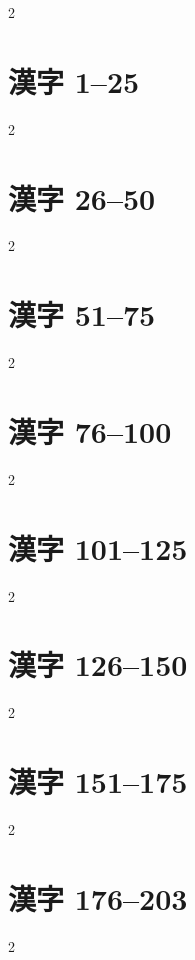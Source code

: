 \documentclass[10pt, a4paper]{ltjbook}
\begin{document}
\setlength{\columnseprule}{0.4pt}
\begin{multicols}{2}
    \vspace*{-4pt plus 10pt minus 10pt} %
	\listofglyph
\end{multicols}

\clearpage
{}

\setlength{\columnseprule}{0pt}


\chapter{漢字 1--25}
\begin{multicols}{2}


\chapter{漢字 26--50}
\begin{multicols}{2}


\chapter{漢字 51--75}
\begin{multicols}{2}


\chapter{漢字 76--100}
\begin{multicols}{2}


\chapter{漢字 101--125}
\begin{multicols}{2}


\chapter{漢字 126--150}
\begin{multicols}{2}


\chapter{漢字 151--175}
\begin{multicols}{2}


\chapter{漢字 176--203}
\begin{multicols}{2}



\end{multicols}
\end{multicols}
\end{multicols}
\end{multicols}
\end{multicols}
\end{multicols}
\end{multicols}
\end{multicols}
\end{document}
